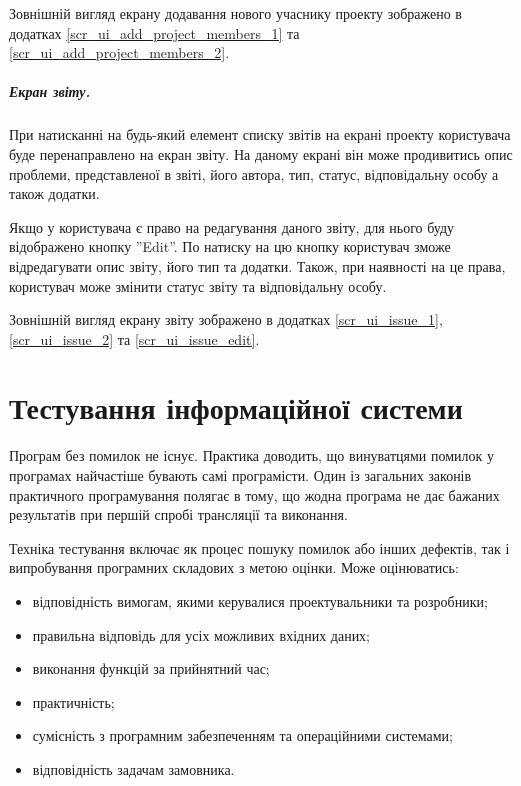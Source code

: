\documentclass[../main.tex]{subfiles}
\begin{document}
Зовнішній вигляд екрану додавання нового учаснику проекту зображено в додатках \ref{scr_ui_add_project_members_1} та \ref{scr_ui_add_project_members_2}.

\subparagraph{Екран звіту.}

При натисканні на будь-який елемент списку звітів на екрані проекту користувача буде перенаправлено на екран звіту. На даному екрані він може продивитись опис проблеми, представленої в звіті, його автора, тип, статус, відповідальну особу а також додатки.

Якщо у користувача є право на редагування даного звіту, для нього буду відображено кнопку ''Edit''. По натиску на цю кнопку користувач зможе відредагувати опис звіту, його тип та додатки. Також, при наявності на це права, користувач може змінити статус звіту та відповідальну особу.

Зовнішній вигляд екрану звіту зображено в додатках \ref{scr_ui_issue_1}, \ref{scr_ui_issue_2} та \ref{scr_ui_issue_edit}.


\section{Тестування інформаційної системи}

Програм без помилок не існує. Практика доводить, що винуватцями помилок у програмах найчастіше бувають самі програмісти. Один із загальних законів практичного програмування полягає в тому, що жодна програма не дає бажаних результатів при першій спробі трансляції та виконання.

Техніка тестування включає як процес пошуку помилок або інших дефектів, так і випробування програмних складових з метою оцінки. Може оцінюватись:
\begin{itemize}
	\item відповідність вимогам, якими керувалися проектувальники та розробники;
	\item правильна відповідь для усіх можливих вхідних даних;
	\item виконання функцій за прийнятний час;
	\item практичність;
	\item сумісність з програмним забезпеченням та операційними системами;
	\item відповідність задачам замовника.
\end{itemize}
\end{document}
